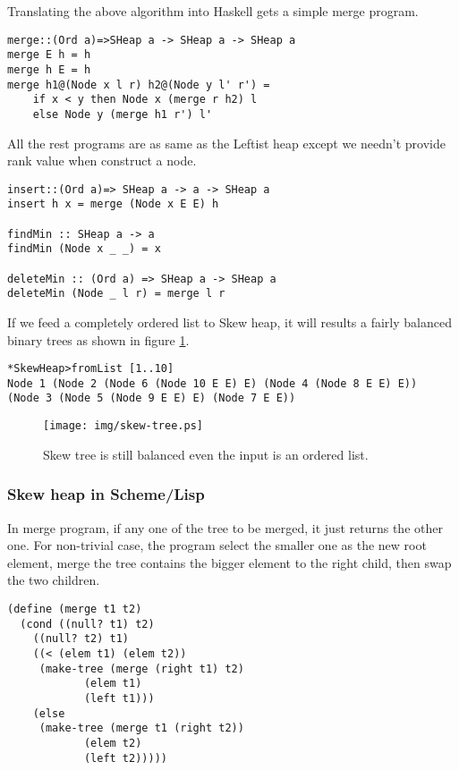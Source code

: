 \documentclass{article}
\begin{document}
Translating the above algorithm into Haskell gets a simple merge program.

\lstset{language=Haskell}
\begin{lstlisting}
merge::(Ord a)=>SHeap a -> SHeap a -> SHeap a
merge E h = h
merge h E = h
merge h1@(Node x l r) h2@(Node y l' r') =
    if x < y then Node x (merge r h2) l
    else Node y (merge h1 r') l'
\end{lstlisting}

All the rest programs are as same as the Leftist heap except we needn't
provide rank value when construct a node.

\begin{lstlisting}
insert::(Ord a)=> SHeap a -> a -> SHeap a
insert h x = merge (Node x E E) h

findMin :: SHeap a -> a
findMin (Node x _ _) = x

deleteMin :: (Ord a) => SHeap a -> SHeap a
deleteMin (Node _ l r) = merge l r
\end{lstlisting}

If we feed a completely ordered list to Skew heap, it will results a
fairly balanced binary trees as shown in figure \ref{fig:skew-tree}.

\begin{lstlisting}
*SkewHeap>fromList [1..10]
Node 1 (Node 2 (Node 6 (Node 10 E E) E) (Node 4 (Node 8 E E) E))
(Node 3 (Node 5 (Node 9 E E) E) (Node 7 E E))
\end{lstlisting}

\begin{figure}[htbp]
   \begin{center}
   	  \texttt{[image: img/skew-tree.ps]}
    \caption{Skew tree is still balanced even the input is an ordered list.} \label{fig:skew-tree}
   \end{center}
\end{figure}

\subsubsection*{Skew heap in Scheme/Lisp}

In merge program, if any one of the tree to be merged, it just returns the
other one. For non-trivial case, the program select the smaller one
as the new root element, merge the tree contains the bigger element
to the right child, then swap the two children.

\lstset{language = lisp}
\begin{lstlisting}
(define (merge t1 t2)
  (cond ((null? t1) t2)
	((null? t2) t1)
	((< (elem t1) (elem t2))
	 (make-tree (merge (right t1) t2)
		    (elem t1)
		    (left t1)))
	(else
	 (make-tree (merge t1 (right t2))
		    (elem t2)
		    (left t2)))))
\end{lstlisting}
\end{document}
